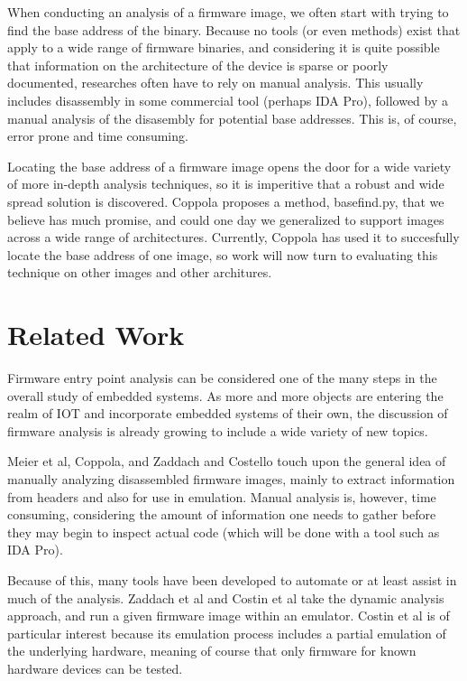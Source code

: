 \documentclass[letterpaper,twocolumn,10pt]{article}
\begin{document}
When conducting an analysis of a firmware image, we often start with trying to find the base address of the binary. Because no tools (or even methods) exist that apply to a wide range of firmware binaries, and considering it is quite possible that information on the architecture of the device is sparse or poorly documented, researches often have to rely on manual analysis. This usually includes disassembly in some commercial tool (perhaps IDA Pro), followed by a manual analysis of the disasembly for potential base addresses. This is, of course, error prone and time consuming.

Locating the base address of a firmware image opens the door for a wide variety of more in-depth analysis techniques, so it is imperitive that a robust and wide spread solution is discovered. Coppola\cite{cloudscale2013} proposes a method, basefind.py, that we believe has much promise, and could one day we generalized to support images across a wide range of architectures. Currently, Coppola has used it to succesfully locate the base address of one image, so work will now turn to evaluating this technique on other images and other architures.

\section{Related Work}
Firmware entry point analysis can be considered one of the many steps in the overall study of embedded systems. As more and more objects are entering the realm of IOT and incorporate embedded systems of their own, the discussion of firmware analysis is already growing to include a wide variety of new topics. 

Meier et al\cite{fitnesstrackers2016}, Coppola\cite{cloudscale2013}, and Zaddach and Costello\cite{securityfirmwarereverse2013} touch upon the general idea of manually analyzing disassembled firmware images, mainly to extract information from headers and also for use in emulation. Manual analysis is, however, time consuming, considering the amount of information one needs to gather before they may begin to inspect actual code (which will be done with a tool such as IDA Pro). 

Because of this, many tools have been developed to automate or at least assist in much of the analysis. Zaddach et al\cite{avatar} and Costin et al\cite{dynamicanalysisatscale2015} take the dynamic analysis approach, and run a given firmware image within an emulator. Costin et al\cite{dynamicanalysisatscale2015} is of particular interest because its emulation process includes a partial emulation of the underlying hardware, meaning of course that only firmware for known hardware devices can be tested.
\end{document}
